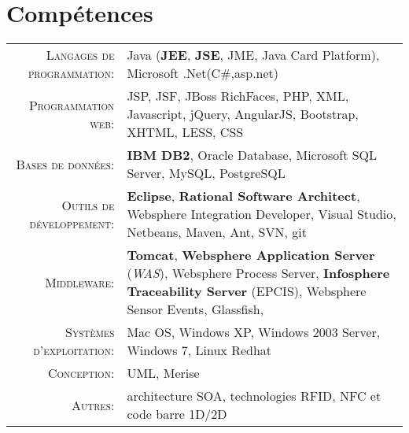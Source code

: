 \section{\texorpdfstring{\color{Blue}Compétences}{Compétences}}
\renewcommand{\arraystretch}{1.2}
\begin{tabular}{rp{13cm}} 
	\textsc{Langages de programmation:}  &   Java (\textbf{JEE}, \textbf{JSE}, JME, Java Card Platform), Microsoft .Net(C\#,asp.net)\\ 
	\textsc{Programmation web:}               &   JSP, JSF, JBoss RichFaces, PHP, XML, Javascript, jQuery, AngularJS, Bootstrap, XHTML, LESS, CSS\\ 
	\textsc{Bases de données:}                  &   \textbf{IBM DB2}, Oracle Database, Microsoft SQL Server, MySQL, PostgreSQL \\ 
	\textsc{Outils de développement:}	  &   \textbf {Eclipse}, \textbf{Rational Software Architect}, Websphere Integration Developer, Visual Studio, Netbeans, Maven, Ant, SVN, git\\
	\textsc{Middleware:}				        &   \textbf{Tomcat}, \textbf{Websphere Application Server} (\emph{WAS}), Websphere Process Server, \textbf{Infosphere Traceability Server} (EPCIS), Websphere Sensor Events, 							                          Glassfish, \\ 
	\textsc{Systèmes d'exploitation:}	        &   Mac OS, Windows XP, Windows 2003 Server, Windows 7, Linux Redhat\\ 
	\textsc{Conception:}				        &   UML, Merise\\
	\textsc{Autres:}					        &   architecture SOA, technologies RFID, NFC et code barre 1D/2D
\end{tabular}